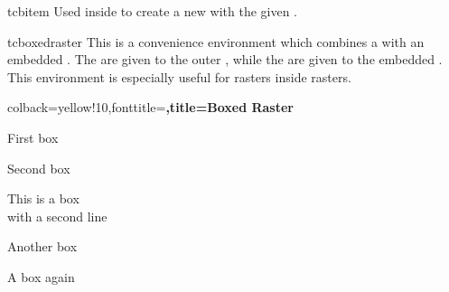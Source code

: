\begin{docCommand}[doc new=2014-11-10]{tcbitem}{}
  Used inside  to create a new 
  with the given .
\end{docCommand}


\clearpage
\begin{docEnvironment}[doc new=2016-02-19]{tcboxedraster}{}
  This is a convenience environment which combines a  with
  an embedded . The  are given to the
  outer , while the  are given to the
  embedded .
  This environment is especially useful for rasters inside rasters.

\begin{dispExample}
\begin{tcboxedraster}[raster columns=3, raster equal height,
  size=small,colframe=red!50!black,colback=red!10!white,colbacktitle=red!50!white,
  title={Box \# \thetcbrasternum}]
  {colback=yellow!10,fonttitle=\bfseries,title=Boxed Raster}
  \begin{tcolorbox}First box\end{tcolorbox}
  \begin{tcolorbox}Second box\end{tcolorbox}
  \begin{tcolorbox}This is a box\\with a second line\end{tcolorbox}
  \begin{tcolorbox}Another box\end{tcolorbox}
  \begin{tcolorbox}A box again\end{tcolorbox}
\end{tcboxedraster}
\end{dispExample}


\end{docEnvironment}
